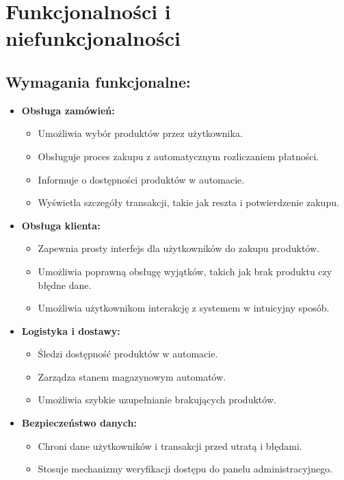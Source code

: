 ﻿%
\chapter{Funkcjonalności i niefunkcjonalności}

\section{Wymagania funkcjonalne:}
\begin{itemize}
       
    \item \textbf{Obsługa zamówień:}
    \begin{itemize}
        \item Umożliwia wybór produktów przez użytkownika.
        \item Obsługuje proces zakupu z automatycznym rozliczaniem płatności.
        \item Informuje o dostępności produktów w automacie.
        \item Wyświetla szczegóły transakcji, takie jak reszta i potwierdzenie zakupu.
    \end{itemize}
    
    \item \textbf{Obsługa klienta:}
    \begin{itemize}
        \item Zapewnia prosty interfejs dla użytkowników do zakupu produktów.
        \item Umożliwia poprawną obsługę wyjątków, takich jak brak produktu czy błędne dane.
        \item Umożliwia użytkownikom interakcję z systemem w intuicyjny sposób.
    \end{itemize}
    
    \item \textbf{Logistyka i dostawy:}
    \begin{itemize}
        \item Śledzi dostępność produktów w automacie.
        \item Zarządza stanem magazynowym automatów.
        \item Umożliwia szybkie uzupełnianie brakujących produktów.
    \end{itemize}
    
    \item \textbf{Bezpieczeństwo danych:}
    \begin{itemize}
        \item Chroni dane użytkowników i transakcji przed utratą i błędami.
        \item Stosuje mechanizmy weryfikacji dostępu do panelu administracyjnego.
    \end{itemize}
    

\end{itemize}
